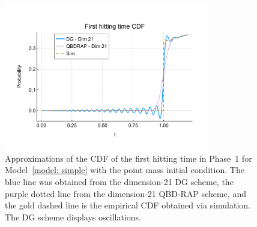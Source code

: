 \begin{figure}[h]
	\centering
	\includegraphics[width=0.8\textwidth,trim={0cm 1.25cm 0cm 1.25cm},clip]{chapter6/figs/hitting_times_model/hitting_times/point_mass/cdf_order21DG_and_sims.pdf}%
	\caption{Approximations of the CDF of the first hitting time in Phase~1 for Model~\ref{model: simple} with the point mass initial condition. The blue line was obtained from the dimension-21 DG scheme, the purple dotted line from the dimension-21 QBD-RAP scheme, and the gold dashed line is the empirical CDF obtained via simulation. The DG scheme displays oscillations. } 
	\label{fig: hitting time oscillation} 
\end{figure}

\FloatBarrier
